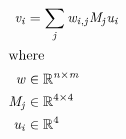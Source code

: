 \documentclass[12pt]{article}
\begin{document}
\begin{center}
\resizebox{\textwidth}{!} 
{
\begin{minipage}[c]{\textwidth}
\begin{align*}
\mathit{v}_{ \mathit{i} } & = \sum_\mathit{j} \mathit{w}_{\mathit{i}, \mathit{j}}\mathit{M}_{ \mathit{j} }\mathit{u}_{ \mathit{i} } \\
\intertext{where} 
\mathit{w} & \in \mathbb{R}^{ \mathit{n} \times \mathit{m} } \\
\mathit{M}_{\mathit{j}} & \in \mathbb{R}^{ 4 \times 4 } \\
\mathit{u}_{\mathit{i}} & \in \mathbb{R}^{ 4} \\
\\
\end{align*}
\end{minipage}
}
\end{center}
\end{document}
